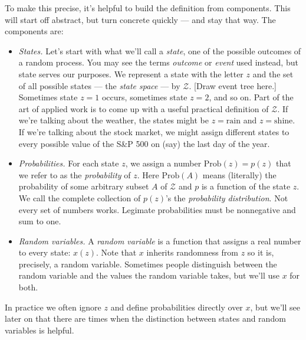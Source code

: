 To make this precise, it's helpful to build the definition
from components.
This will start off abstract, but turn concrete quickly --- and stay that way.
The components are:
%
\begin{itemize}
\item {\it States.\/}  Let's start with what we'll call a {\it state\/},
one of the possible outcomes of a random process.
You may see the terms {\it outcome\/} or {\it event} used instead,
but state serves our purposes.
We represent a state with the letter $z$
and the set of all possible states --- the {\it state space\/} --- by $\mathcal{Z}$.
[Draw event tree here.]
Sometimes state $z=1$ occurs, sometimes state $z=2$, and so on.
Part of the art of applied work is to come up with
a useful practical definition of $\mathcal{Z}$.
If we're talking about the weather, the states might be
$z = \mbox{rain}$ and $z = \mbox{shine}$.
If we're talking about the stock market, we might assign different states to every possible value
of the S\&P 500 on (say) the last day of the year.

\item {\it Probabilities.\/}
For each state $z$, we assign a number $\mbox{Prob}(z) = p(z)$
that we refer to as the {\it probability\/} of $z$.
Here $\mbox{Prob}(A)$ means (literally) the probability of
some arbitrary subset $A$ of $\mathcal{Z}$
and $p$ is a function of the state $z$.
We call the complete collection of $p(z)$'s
the {\it probability distribution\/}.
Not every set of numbers works.
Legimate probabilities must be nonnegative and sum to one.

\item {\it Random variables.\/}
A {\it random variable\/} is a function that
assigns a real number to every state:  $x(z)$.
Note that $x$ inherits randomness from $z$ so it is, precisely,
a random variable.
Sometimes people distinguish between the random variable
and the values the random variable takes,
but we'll use $x$ for both.
\end{itemize}
%
In practice we often ignore $z$
and define probabilities directly over $x$,
but we'll see later on that there are times when the distinction
between states and random variables is helpful.

